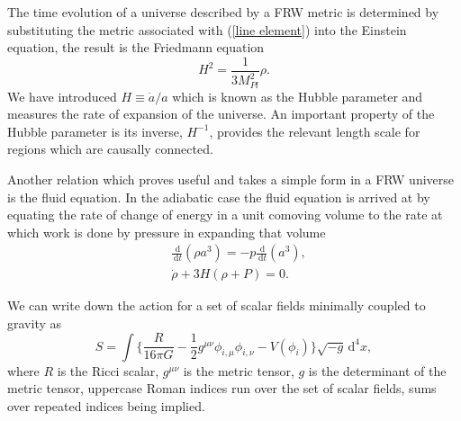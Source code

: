 \documentclass[letterpaper,11pt]{article}
\newcommand{\ud}{\,\mathrm{d}}
\begin{document}
The time evolution of a universe described by a FRW metric is determined by substituting the metric associated with (\ref{line element}) into the Einstein equation, the result is the Friedmann equation
\begin{equation}
H^2=\frac{1}{3M_{Pl}^2}\rho. \label{fried eqn}
\end{equation}
We have introduced $H\equiv \dot{a}/a$ which is known as the Hubble parameter and measures the rate of expansion of the universe. An important property of the Hubble parameter is its inverse, $H^{-1}$, provides the relevant length scale for regions which are causally connected.%

Another relation which proves useful and takes a simple form in a FRW universe is the fluid equation. In the adiabatic case the fluid equation is arrived at by equating the rate of change of energy in a unit comoving volume to the rate at which work is done by pressure in expanding that volume
\begin{align}
&\frac{\ud}{\ud t}(\rho a^3)=-p\frac{\ud}{\ud t}(a^3),\\
&\dot{\rho}+3H(\rho +P)=0. \label{fluid eqn}
\end{align}

We can write down the action for a set of scalar fields minimally coupled to gravity as
\begin{equation}
S=\int \Big\{ \frac{R}{16\pi G} - \frac{1}{2}g^{\mu \nu} \phi_{i,\mu} \phi_{i,\nu}-V(\phi_i) \Big\} \sqrt{-g}\ud^4x,
\end{equation}
where $R$ is the Ricci scalar, $g^{\mu \nu}$ is the metric tensor, $g$ is the determinant of the metric tensor, uppercase Roman indices run over the set of scalar fields, sums over repeated indices being implied. %
\end{document}
